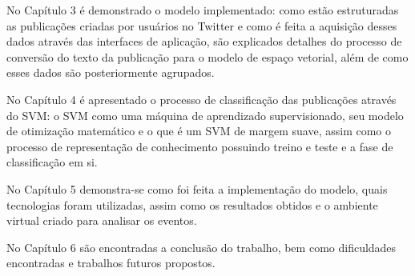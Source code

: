 No Capítulo 3 é demonstrado o modelo implementado: como estão estruturadas as publicações criadas por usuários no Twitter e como é feita a aquisição desses dados através das interfaces de aplicação, são explicados detalhes do processo de conversão do texto da publicação para o modelo de espaço vetorial, além de como esses dados são posteriormente agrupados.

No Capítulo 4 é apresentado o processo de classificação das publicações através do SVM: o SVM como uma máquina de aprendizado supervisionado, seu modelo de otimização matemático e o que é um SVM de margem suave, assim como o processo de representação de conhecimento possuindo treino e teste e a fase de classificação em si.

No Capítulo 5 demonstra-se como foi feita a implementação do modelo, quais tecnologias foram utilizadas, assim como os resultados obtidos e o ambiente virtual criado para analisar os eventos.

No Capítulo 6 são encontradas a conclusão do trabalho, bem como dificuldades encontradas e trabalhos futuros propostos.